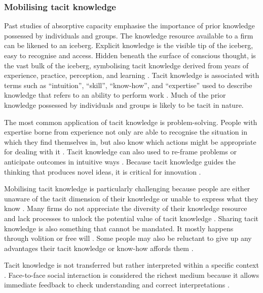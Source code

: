\subsubsection{Mobilising tacit knowledge}

Past studies of absorptive capacity emphasise the importance of prior knowledge possessed by individuals and groups. The knowledge resource available to a firm can be likened to an iceberg. Explicit knowledge is the visible tip of the iceberg, easy to recognise and access. Hidden beneath the surface of conscious thought, is the vast bulk of the iceberg, symbolising tacit knowledge derived from years of experience, practice, perception, and learning \citep{spender1996making,haldin2000difficulties,mcadam2007exploring,rebernik2007fostering}. Tacit knowledge is associated with terms such as \enquote{intuition}, \enquote{skill}, \enquote{know-how}, and \enquote{expertise} used to describe knowledge that refers to an ability to perform work \citep{horvath2000working,mcadam2007exploring}. Much of the prior knowledge possessed by individuals and groups is likely to be tacit in nature. \medskip

The most common application of tacit knowledge is problem-solving. People with expertise borne from experience not only are able to recognise the situation in which they find themselves in, but also know which actions might be appropriate for dealing with it \citep{simon1971human,leonard1998role}. Tacit knowledge can also used to re-frame problems or anticipate outcomes in intuitive ways \citep{leonard1998role}. Because tacit knowledge guides the thinking that produces novel ideas, it is critical for innovation \citep{leonard1998role,amar2008descriptive}. \medskip

Mobilising tacit knowledge is particularly challenging because people are either unaware of the tacit dimension of their knowledge or unable to express what they know \citep{polanyi1966tacit,leonard1998role}. Many firms do not appreciate the diversity of their knowledge resource and lack processes to unlock the potential value of tacit knowledge \citep{nonaka1994dynamic,horvath2000working}. Sharing tacit knowledge is also something that cannot be mandated. It mostly happens through volition or free will \citep{polanyi1966tacit}. Some people may also be reluctant to give up any advantages their tacit knowledge or know-how affords them \citep{eraut2000non}. \medskip

Tacit knowledge is not transferred but rather interpreted within a specific context \citep{nonaka1995knowledge,duguid2005art,marabelli2014knowing}. Face-to-face social interaction is considered the richest medium because it allows immediate feedback to check understanding and correct interpretations \citep{koskinen2003tacit}. \medskip

